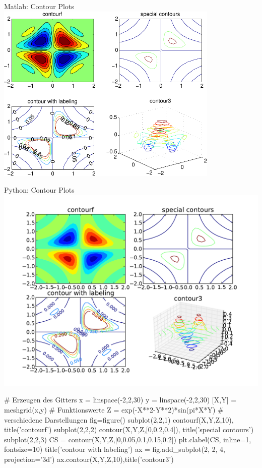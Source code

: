 \documentclass[hyperref={xetex}]{beamer}
\begin{document}
% 
% 
\begin{frame}[fragile]{Matlab: Contour Plots}
\hfil\includegraphics[width=0.8\textwidth]{figures/beispiel_function_plot_contour}\hfil
\end{frame}
% 
% 
\begin{frame}[fragile]{}
\end{frame}
% 
% 
\begin{frame}[fragile]{Python: Contour Plots}
\hfil\includegraphics[width=1\textwidth]{figures/function_plot_contour_py}\hfil
\end{frame}
% 
% 
\begin{frame}[fragile]{}
  \begin{pyin}
# Erzeugen des Gitters
x = linspace(-2,2,30)
y = linspace(-2,2,30)
[X,Y] = meshgrid(x,y)
# Funktionswerte
Z = exp(-X**2-Y**2)*sin(pi*X*Y)
# verschiedene Darstellungen
fig=figure()
subplot(2,2,1)
contourf(X,Y,Z,10), title('contourf')
subplot(2,2,2)
contour(X,Y,Z,[0,0.2,0.4]), title('special contours')
subplot(2,2,3)
CS = contour(X,Y,Z,[0,0.05,0.1,0.15,0.2])
plt.clabel(CS, inline=1, fontsize=10)
title('contour with labeling')
ax = fig.add_subplot(2, 2, 4, projection='3d')
ax.contour(X,Y,Z,10),title('contour3')    
  \end{pyin}
\end{frame}
\end{document}
